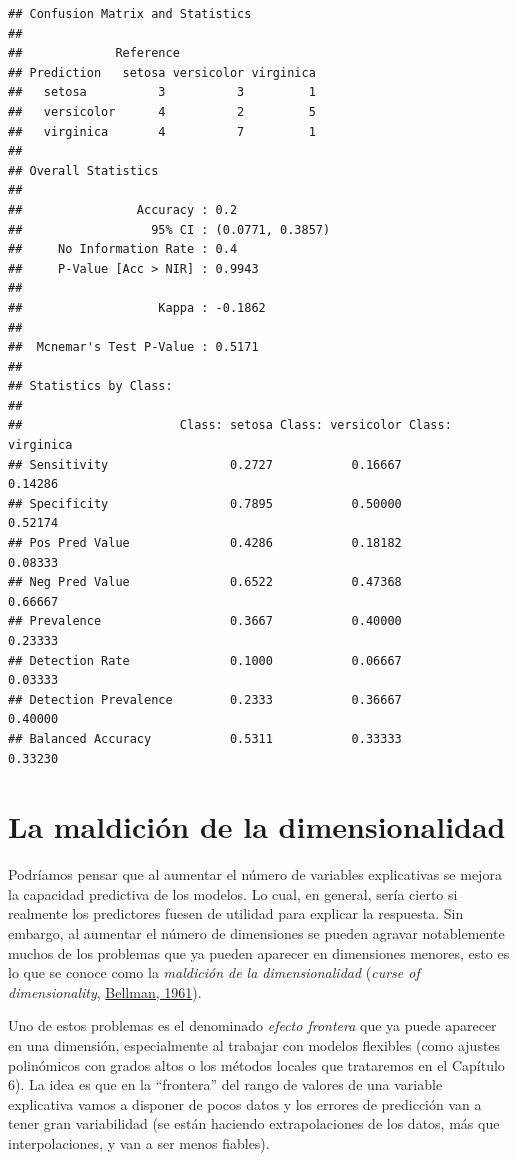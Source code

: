 \documentclass[
  spanish,
]{book}
\theoremstyle{break}
\theoremstyle{definition}
\theoremstyle{definition}
\theoremstyle{definition}
\theoremstyle{definition}
\theoremstyle{remark}
\begin{document}
\begin{verbatim}
## Confusion Matrix and Statistics
## 
##             Reference
## Prediction   setosa versicolor virginica
##   setosa          3          3         1
##   versicolor      4          2         5
##   virginica       4          7         1
## 
## Overall Statistics
##                                           
##                Accuracy : 0.2             
##                  95% CI : (0.0771, 0.3857)
##     No Information Rate : 0.4             
##     P-Value [Acc > NIR] : 0.9943          
##                                           
##                   Kappa : -0.1862         
##                                           
##  Mcnemar's Test P-Value : 0.5171          
## 
## Statistics by Class:
## 
##                      Class: setosa Class: versicolor Class: virginica
## Sensitivity                 0.2727           0.16667          0.14286
## Specificity                 0.7895           0.50000          0.52174
## Pos Pred Value              0.4286           0.18182          0.08333
## Neg Pred Value              0.6522           0.47368          0.66667
## Prevalence                  0.3667           0.40000          0.23333
## Detection Rate              0.1000           0.06667          0.03333
## Detection Prevalence        0.2333           0.36667          0.40000
## Balanced Accuracy           0.5311           0.33333          0.33230
\end{verbatim}

\hypertarget{dimen-curse}{%
\section{La maldición de la dimensionalidad}\label{dimen-curse}}

Podríamos pensar que al aumentar el número de variables explicativas se mejora la capacidad predictiva de los modelos. Lo cual, en general, sería cierto si realmente los predictores fuesen de utilidad para explicar la respuesta.
Sin embargo, al aumentar el número de dimensiones se pueden agravar notablemente muchos de los problemas que ya pueden aparecer en dimensiones menores, esto es lo que se conoce como la \emph{maldición de la dimensionalidad} (\emph{curse of dimensionality}, \protect\hyperlink{ref-bellman1961adaptive}{Bellman, 1961}).

Uno de estos problemas es el denominado \emph{efecto frontera} que ya puede aparecer en una dimensión, especialmente al trabajar con modelos flexibles (como ajustes polinómicos con grados altos o los métodos locales que trataremos en el Capítulo 6).
La idea es que en la ``frontera'' del rango de valores de una variable explicativa vamos a disponer de pocos datos y los errores de predicción van a tener gran variabilidad (se están haciendo extrapolaciones de los datos, más que interpolaciones, y van a ser menos fiables).
\end{document}

